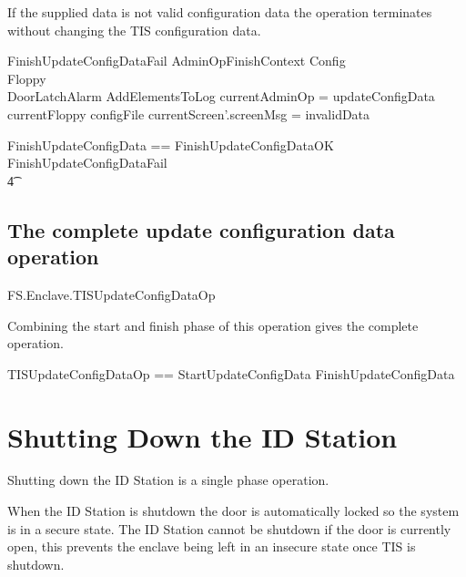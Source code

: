 If the supplied data is not valid configuration data the operation
terminates without changing the TIS configuration data.

\begin{schema}{FinishUpdateConfigDataFail}
        AdminOpFinishContext
\also
        \Xi Config
\\      \Xi Floppy
\\      \Xi DoorLatchAlarm
\also
        AddElementsToLog
\where
        \The currentAdminOp = updateConfigData
\also        
        currentFloppy \notin \ran configFile
\also
        currentScreen'.screenMsg = invalidData
\end{schema}

\begin{zed}
        FinishUpdateConfigData == FinishUpdateConfigDataOK \lor
        FinishUpdateConfigDataFail
\\ \t4  \lor
        [~ BadAdminLogout | enclaveStatus = waitingFinishAdminOp 
\\ \t6  \land \The currentAdminOp = updateConfigData      ~]
\end{zed}

\subsection{The complete update configuration data operation}

\begin{traceunit}{FS.Enclave.TISUpdateConfigDataOp}
\end{traceunit}

Combining the start and finish phase of this operation gives the
complete operation.

\begin{zed}
        TISUpdateConfigDataOp == StartUpdateConfigData \lor FinishUpdateConfigData
\end{zed}


\section{Shutting Down the ID Station}

Shutting down the ID Station is a single phase operation.

When the ID Station is shutdown the door is automatically locked so
the system is in a secure state. The ID Station cannot be shutdown if
the door is currently open, this prevents the enclave being left in an
insecure state once TIS is shutdown.

